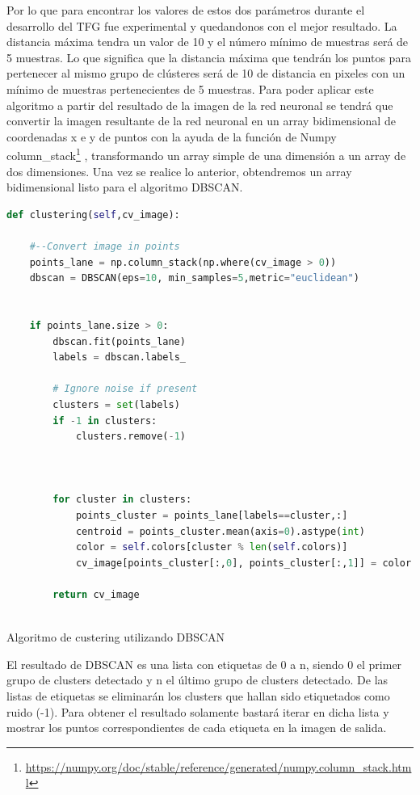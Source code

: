 Por lo que para encontrar los valores de estos dos parámetros durante el desarrollo del TFG fue experimental y quedandonos con el mejor resultado. La distancia máxima tendra un valor de 10 
y el número mínimo de muestras será de 5 muestras. Lo que significa que la distancia máxima que tendrán los puntos para pertenecer al mismo grupo de clústeres será de 10 de distancia en pixeles
con un mínimo de muestras pertenecientes de 5 muestras. Para poder aplicar este algoritmo a partir del resultado de la imagen de la red neuronal se tendrá que convertir la imagen resultante
de la red neuronal en un array bidimensional de coordenadas x e y de puntos con la ayuda de la función de Numpy column\_stack\footnote{\url{https://numpy.org/doc/stable/reference/generated/numpy.column_stack.html}} , 
transformando un array simple de una dimensión a un array de dos dimensiones. Una vez se realice lo anterior, obtendremos un array bidimensional listo para el algoritmo DBSCAN.\newline


\begin{code}[h]
  \begin{lstlisting}[language=Python]
    def clustering(self,cv_image):

    #--Convert image in points
    points_lane = np.column_stack(np.where(cv_image > 0))
    dbscan = DBSCAN(eps=10, min_samples=5,metric="euclidean")
    

    if points_lane.size > 0:
        dbscan.fit(points_lane)
        labels = dbscan.labels_

        # Ignore noise if present
        clusters = set(labels)
        if -1 in clusters:
            clusters.remove(-1)
      
      
            
        for cluster in clusters:
            points_cluster = points_lane[labels==cluster,:]
            centroid = points_cluster.mean(axis=0).astype(int)
            color = self.colors[cluster % len(self.colors)]
            cv_image[points_cluster[:,0], points_cluster[:,1]] = color

        return cv_image
  
  \end{lstlisting}
  \caption[Algoritmo de custering utilizando DBSCAN]{Algoritmo de custering utilizando DBSCAN}
  \label{cod:codejemplo}
  \end{code}  
  

El resultado de DBSCAN es una lista con etiquetas de 0 a n, siendo 0 el primer grupo de clusters detectado y 
n el último grupo de clusters detectado. De las listas de etiquetas se eliminarán los clusters que hallan sido etiquetados como ruido (-1). Para obtener el resultado solamente bastará iterar en dicha lista y mostrar los puntos correspondientes de cada etiqueta en la imagen de salida.

